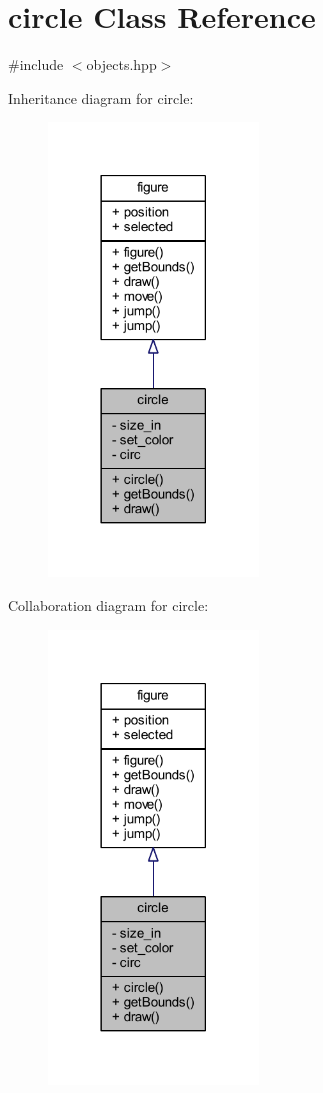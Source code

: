\hypertarget{classcircle}{}\section{circle Class Reference}
\label{classcircle}


{\ttfamily \#include $<$objects.\+hpp$>$}



Inheritance diagram for circle\+:
\nopagebreak
\begin{figure}[H]
\begin{center}
\leavevmode
\includegraphics[width=158pt]{classcircle__inherit__graph}
\end{center}
\end{figure}


Collaboration diagram for circle\+:
\nopagebreak
\begin{figure}[H]
\begin{center}
\leavevmode
\includegraphics[width=158pt]{classcircle__coll__graph}
\end{center}
\end{figure}
